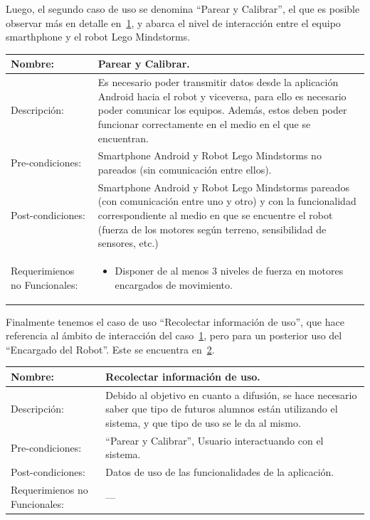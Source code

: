 \documentclass[letterpaper,12pt]{article} %
\numberwithin{equation}{section} %
\numberwithin{figure}{section} %
\numberwithin{table}{section} %
\begin{document}
Luego, el segundo caso de uso se denomina ``Parear y Calibrar'', el que es posible observar m\'as en detalle en~\ref{tab:Parear}, y abarca el nivel de interacci\'on entre el equipo smarthphone y el robot Lego Mindstorms.

\begin{table}[hb!]
  \begin{tabular}{p{3cm}p{7cm}}\hline\hline
    Nombre: & Parear y Calibrar. \\ \hline
    Descripci\'on: & Es necesario poder transmitir datos desde la aplicaci\'on Android hacia el robot y viceversa, para ello es necesario poder comunicar los equipos. Adem\'as, estos deben poder funcionar correctamente en el medio en el que se encuentran.\\ \hline %
    Pre-condiciones: & Smartphone Android y Robot Lego Mindstorms no pareados (sin comunicaci\'on entre ellos).\\ \hline
    Post-condiciones: & Smartphone Android y Robot Lego Mindstorms pareados (con comunicaci\'on entre uno y otro) y con la funcionalidad correspondiente al medio en que se encuentre el robot (fuerza de los motores seg\'un terreno, sensibilidad de sensores, etc.)\\ \hline
    Requerimienos no Funcionales: &
    \begin{itemize}
    \item Disponer de al menos 3 niveles de fuerza en motores encargados de movimiento.
    \end{itemize}\\ \hline\hline %
  \end{tabular}
  \label{tab:Parear}
\end{table}

Finalmente tenemos el caso de uso ``Recolectar informaci\'on de uso'', que hace referencia al \'ambito de interacci\'on del caso~\ref{tab:Parear}, pero para un posterior uso del ``Encargado del Robot''. Este se encuentra en~\ref{tab:Recolectar}.

\begin{table}[hb!]
  \begin{tabular}{p{3cm}p{7cm}}\hline\hline
    Nombre: & Recolectar informaci\'on de uso.\\ \hline
    Descripci\'on: & Debido al objetivo en cuanto a difusi\'on, se hace necesario saber que tipo de futuros alumnos est\'an utilizando el sistema, y que tipo de uso se le da al mismo.\\ \hline %
    Pre-condiciones: & ``Parear y Calibrar'', Usuario interactuando con el sistema.\\ \hline
    Post-condiciones: & Datos de uso de las funcionalidades de la aplicaci\'on.\\ \hline
    Requerimienos no Funcionales: & ---\\ \hline\hline %
  \end{tabular}
  \label{tab:Recolectar}
\end{table}
\end{document}
